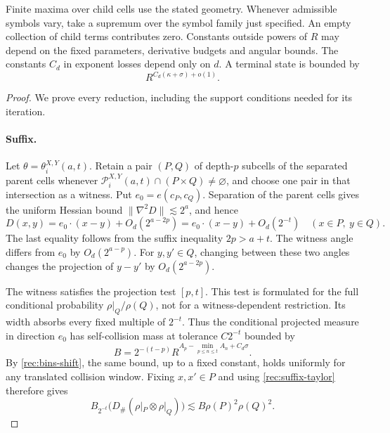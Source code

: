 \begin{proposition}
Finite maxima over child cells use the stated geometry.  Whenever admissible
symbols vary, take a supremum over the symbol family just specified.  An
empty collection of child terms contributes zero.  Constants outside powers
of $R$ may depend on
the fixed parameters, derivative budgets and angular bounds.  The
constants $C_d$ in exponent losses depend only on $d$.  A terminal state
is bounded by
\begin{equation}\label{rec:terminal}
 R^{C_d(\kappa+\sigma)+o(1)}.
\end{equation}
\end{proposition}

\begin{proof}
We prove every reduction, including the support conditions needed for
its iteration.

\paragraph{Suffix.}
Let \(\theta=\theta_i^{X,Y}(a,t)\).  Retain a pair \((P,Q)\) of
depth-\(p\) subcells of the separated parent cells whenever
\(\mathcal P_i^{X,Y}(a,t)\cap(P\times Q)\ne\varnothing\), and choose
one pair in that intersection as a witness.  Put \(e_0=e(c_P,c_Q)\).  Separation of the parent cells gives
the uniform Hessian bound \(\|\nabla^2D\|\lesssim2^a\), and hence
\begin{equation}\label{rec:suffix-taylor}
 D(x,y)=e_0\cdot(x-y)+O_d(2^{a-2p})
       =e_0\cdot(x-y)+O_d(2^{-t})
       \quad(x\in P,\ y\in Q).
\end{equation}
The last equality follows from the suffix inequality \(2p>a+t\).
The witness angle differs from \(e_0\) by \(O_d(2^{a-p})\).
For \(y,y'\in Q\), changing between these two angles changes the
projection of \(y-y'\) by \(O_d(2^{a-2p})\).

The witness satisfies the projection test \([p,t]\).  This test is
formulated for the full conditional probability \(\rho|_Q/\rho(Q)\),
not for a witness-dependent restriction.  Its width absorbs every
fixed multiple of \(2^{-t}\).  Thus the conditional projected measure
in direction \(e_0\) has self-collision mass at tolerance
\(C2^{-t}\) bounded by
\begin{equation}\label{rec:suffix-B}
 B=2^{-(t-p)}R^{A_p-\min_{p\le n\le t}A_n+C_d\sigma}.
\end{equation}
By \eqref{rec:bins-shift}, the same bound, up to a fixed constant,
holds uniformly for any translated collision window.  Fixing
\(x,x'\in P\) and using \eqref{rec:suffix-taylor} therefore gives
\[
 B_{2^{-t}}\bigl(D_\#(\rho|_P\otimes\rho|_Q)\bigr)
 \lesssim B\rho(P)^2\rho(Q)^2.
\]


\end{proof}
